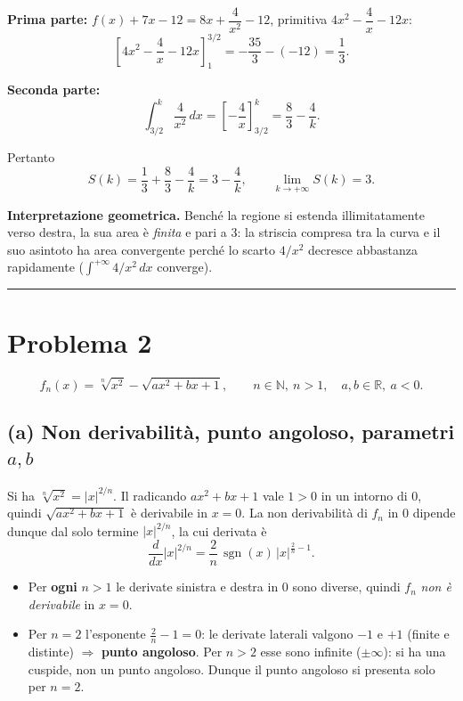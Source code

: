 \documentclass[11pt]{article}
\begin{document}
\textbf{Prima parte:} $f(x)+7x-12=8x+\dfrac{4}{x^2}-12$, primitiva
$4x^2-\dfrac{4}{x}-12x$:
\[
\left[4x^2-\frac{4}{x}-12x\right]_{1}^{3/2}
=-\frac{35}{3}-(-12)=\frac{1}{3}.
\]

\textbf{Seconda parte:}
\[
\int_{3/2}^{k}\frac{4}{x^2}\,dx=\left[-\frac{4}{x}\right]_{3/2}^{k}
=\frac{8}{3}-\frac{4}{k}.
\]

Pertanto
\[
S(k)=\frac{1}{3}+\frac{8}{3}-\frac{4}{k}=3-\frac{4}{k},
\qquad
\boxed{\lim_{k\to+\infty}S(k)=3.}
\]

\textbf{Interpretazione geometrica.} Bench\'e la regione si estenda
illimitatamente verso destra, la sua area \`e \emph{finita} e pari a $3$: la
striscia compresa tra la curva e il suo asintoto ha area convergente perch\'e lo
scarto $4/x^2$ decresce abbastanza rapidamente ($\int^{+\infty}4/x^2\,dx$ converge).

\bigskip
\hrule
\bigskip

\section*{Problema 2}

\[
f_n(x)=\sqrt[n]{x^2}-\sqrt{ax^2+bx+1},\qquad n\in\mathbb{N},\ n>1,\quad a,b\in\mathbb{R},\ a<0.
\]

\subsection*{(a) Non derivabilit\`a, punto angoloso, parametri \texorpdfstring{$a,b$}{a,b}}

Si ha $\sqrt[n]{x^2}=|x|^{2/n}$. Il radicando $ax^2+bx+1$ vale $1>0$ in un intorno di
$0$, quindi $\sqrt{ax^2+bx+1}$ \`e derivabile in $x=0$. La non derivabilit\`a di
$f_n$ in $0$ dipende dunque dal solo termine $|x|^{2/n}$, la cui derivata \`e
\[
\frac{d}{dx}|x|^{2/n}=\frac{2}{n}\,\operatorname{sgn}(x)\,|x|^{\frac{2}{n}-1}.
\]
\begin{itemize}[itemsep=0.15cm]
  \item Per \textbf{ogni} $n>1$ le derivate sinistra e destra in $0$ sono diverse,
        quindi $f_n$ \emph{non \`e derivabile} in $x=0$.
  \item Per $n=2$ l'esponente $\tfrac{2}{n}-1=0$: le derivate laterali valgono
        $-1$ e $+1$ (finite e distinte) $\Rightarrow$ \textbf{punto angoloso}.
        Per $n>2$ esse sono infinite ($\pm\infty$): si ha una cuspide, non un punto
        angoloso. Dunque il punto angoloso si presenta solo per $\boxed{n=2}$.
\end{itemize}
\end{document}
